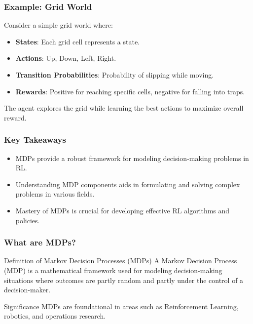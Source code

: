 \documentclass{beamer}
\begin{document}
\begin{frame}[fragile]
    \frametitle{Example: Grid World}
    Consider a simple grid world where:
    \begin{itemize}
        \item \textbf{States}: Each grid cell represents a state.
        \item \textbf{Actions}: Up, Down, Left, Right.
        \item \textbf{Transition Probabilities}: Probability of slipping while moving.
        \item \textbf{Rewards}: Positive for reaching specific cells, negative for falling into traps.
    \end{itemize}
    The agent explores the grid while learning the best actions to maximize overall reward.
\end{frame}

\begin{frame}[fragile]
    \frametitle{Key Takeaways}
    \begin{itemize}
        \item MDPs provide a robust framework for modeling decision-making problems in RL.
        \item Understanding MDP components aids in formulating and solving complex problems in various fields.
        \item Mastery of MDPs is crucial for developing effective RL algorithms and policies.
    \end{itemize}
\end{frame}

\begin{frame}[fragile]
    \frametitle{What are MDPs?}
    \begin{block}{Definition of Markov Decision Processes (MDPs)}
        A Markov Decision Process (MDP) is a mathematical framework used for modeling decision-making situations where outcomes are partly random and partly under the control of a decision-maker.
    \end{block}
    \begin{block}{Significance}
        MDPs are foundational in areas such as Reinforcement Learning, robotics, and operations research.
    \end{block}
\end{frame}
\end{document}
